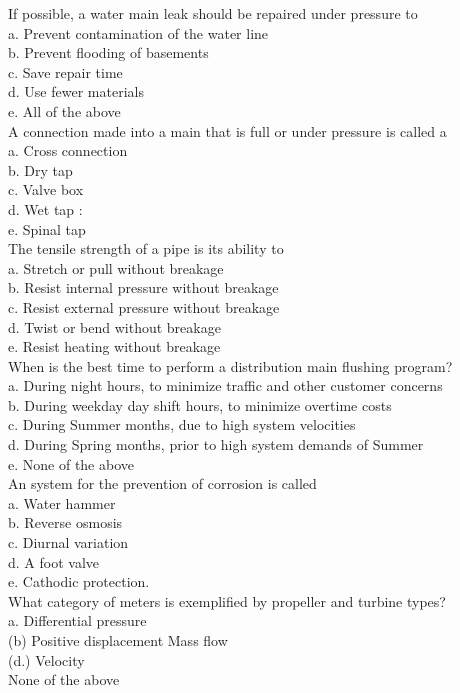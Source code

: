If possible, a water main leak should be repaired under pressure to\\
a. Prevent contamination of the water line\\
b. Prevent flooding of basements\\
c. Save repair time\\
d. Use fewer materials\\
e. All of the above\\

A connection made into a main that is full or under pressure is called a\\
a. Cross connection\\
b. Dry tap\\
c. Valve box\\
d. Wet tap :\\
e. Spinal tap\\

The tensile strength of a pipe is its ability to\\
a. Stretch or pull without breakage\\
b. Resist internal pressure without breakage\\
c. Resist external pressure without breakage\\
d. Twist or bend without breakage\\
e. Resist heating without breakage\\

When is the best time to perform a distribution main flushing program?\\
a. During night hours, to minimize traffic and other customer concerns\\
b. During weekday day shift hours, to minimize overtime costs\\
c. During Summer months, due to high system velocities\\
d. During Spring months, prior to high system demands of Summer\\
e. None of the above\\

An system for the prevention of corrosion is called\\
a. Water hammer\\
b. Reverse osmosis\\
c. Diurnal variation\\
d. A foot valve\\
e. Cathodic protection.\\

What category of meters is exemplified by propeller and turbine types?\\
a. Differential pressure\\
(b) Positive displacement Mass flow\\
(d.) Velocity\\
None of the above\\

